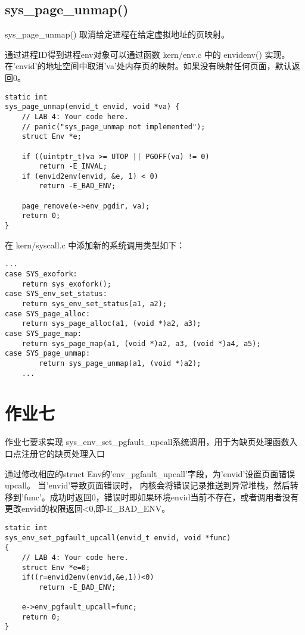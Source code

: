 \documentclass[12pt,a4paper]{article}
\begin{document}
    \subsection{sys\_page\_unmap() }
    sys\_page\_unmap() 取消给定进程在给定虚拟地址的页映射。

    通过进程ID得到进程env对象可以通过函数 kern/env.c 中的 envidenv() 实现。
    在'envid'的地址空间中取消'va'处内存页的映射。如果没有映射任何页面，默认返回0。
    \begin{lstlisting}[style=CPP]
static int
sys_page_unmap(envid_t envid, void *va) {
    // LAB 4: Your code here.
    // panic("sys_page_unmap not implemented");
    struct Env *e;

    if ((uintptr_t)va >= UTOP || PGOFF(va) != 0) 
        return -E_INVAL;
    if (envid2env(envid, &e, 1) < 0) 
        return -E_BAD_ENV;

    page_remove(e->env_pgdir, va);
    return 0;
}
    \end{lstlisting}

    在 kern/syscall.c 中添加新的系统调用类型如下：
    \begin{lstlisting}[style=CPP]
    ...
case SYS_exofork:
    return sys_exofork();
case SYS_env_set_status:
    return sys_env_set_status(a1, a2);
case SYS_page_alloc:
    return sys_page_alloc(a1, (void *)a2, a3);
case SYS_page_map:
    return sys_page_map(a1, (void *)a2, a3, (void *)a4, a5);
case SYS_page_unmap:
        return sys_page_unmap(a1, (void *)a2);
    ...
    \end{lstlisting}


\section{作业七}

    作业七要求实现 sys\_env\_set\_pgfault\_upcall系统调用，用于为缺页处理函数入口点注册它的缺页处理入口

    通过修改相应的struct Env的'env\_pgfault\_upcall'字段，为'envid'设置页面错误upcall。 当'envid'导致页面错误时，
    内核会将错误记录推送到异常堆栈，然后转移到'func'。成功时返回0，错误时即如果环境envid当前不存在，或者调用者没有更改envid的权限返回<0,即-E\_BAD\_ENV。 
    \begin{lstlisting}[style=CPP]
static int
sys_env_set_pgfault_upcall(envid_t envid, void *func)
{
    // LAB 4: Your code here.
    struct Env *e=0;
    if((r=envid2env(envid,&e,1))<0)
        return -E_BAD_ENV;

    e->env_pgfault_upcall=func;
    return 0;
}
    \end{lstlisting}
\end{document}

